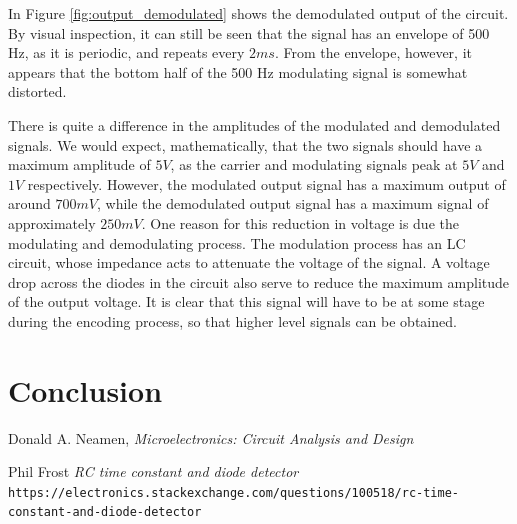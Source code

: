 \documentclass[12pt, a4paper]{article}
\begin{document}
	In Figure \ref{fig:output_demodulated} shows the demodulated output of the circuit. By visual inspection, it can still be seen that the signal has an envelope of 500 Hz, as it is periodic, and repeats every $2ms$. From the envelope, however, it appears that the bottom half of the 500 Hz modulating signal is somewhat distorted.

	There is quite a difference in the amplitudes of the modulated and demodulated signals. We would expect, mathematically, that the two signals should have a maximum amplitude of $5V$, as the carrier and modulating signals peak at $5V$ and $1V$ respectively. However, the modulated output signal has a maximum output of around $700mV$, while the demodulated output signal has a maximum signal of approximately $250mV$. One reason for this reduction in voltage is due the modulating and demodulating process. The modulation process has an LC circuit, whose impedance acts to attenuate the voltage of the signal. A voltage drop across the diodes in the circuit also serve to reduce the maximum amplitude of the output voltage. It is clear that this signal will have to be at some stage during the encoding process, so that higher level signals can be obtained.

\section{Conclusion} %
\label{sec:conclusion}
	

\begin{thebibliography}{500}

	  Donald A. Neamen,
	  \textit{Microelectronics: Circuit Analysis and Design}

	Phil Frost
	\textit{RC time constant and diode detector}
	\texttt{https://electronics.stackexchange.com/questions/100518/rc-time-constant-and-diode-detector}

\end{thebibliography}
\end{document}

